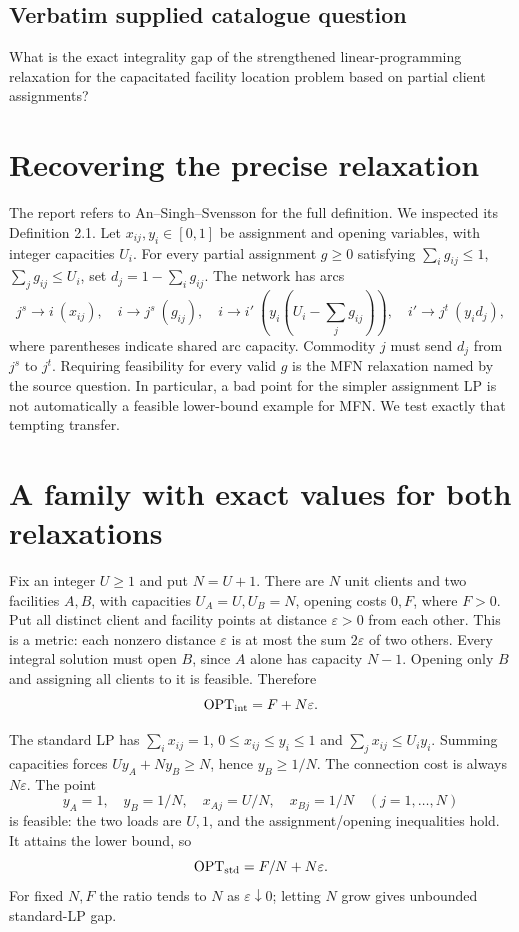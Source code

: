 \documentclass[11pt]{article}
\begin{document}
\subsection{Verbatim supplied catalogue question}
What is the exact integrality gap of the strengthened linear-programming relaxation for the capacitated facility location problem based on partial client assignments?

\section{Recovering the precise relaxation}
The report refers to An--Singh--Svensson for the full definition. We inspected
its Definition 2.1. Let $x_{ij},y_i\in[0,1]$ be assignment and opening
variables, with integer capacities $U_i$. For every partial assignment $g\ge0$
satisfying $\sum_i g_{ij}\le1$, $\sum_jg_{ij}\le U_i$, set
$d_j=1-\sum_i g_{ij}$. The network has arcs
\[
j^s\longrightarrow i\ (x_{ij}),\quad i\longrightarrow j^s\ (g_{ij}),\quad
i\longrightarrow i'\ \left(y_i\left(U_i-\sum_jg_{ij}\right)\right),\quad
i'\longrightarrow j^t\ (y_i d_j),
\]
where parentheses indicate shared arc capacity. Commodity $j$ must send $d_j$
from $j^s$ to $j^t$. Requiring feasibility for every valid $g$ is the
MFN relaxation named by the source question. In particular, a bad point for
the simpler assignment LP is not automatically a feasible lower-bound example
for MFN. We test exactly that tempting transfer.

\section{A family with exact values for both relaxations}
Fix an integer $U\ge1$ and put $N=U+1$. There are $N$ unit clients and two
facilities $A,B$, with capacities $U_A=U,U_B=N$, opening costs $0,F$,
where $F>0$. Put all distinct client and facility points at distance
$\varepsilon>0$ from each other. This is a metric: each nonzero distance
$\varepsilon$ is at most the sum $2\varepsilon$ of two others.
Every integral solution must open $B$, since $A$ alone has capacity $N-1$.
Opening only $B$ and assigning all clients to it is feasible. Therefore
\[
\mathrm{OPT}_{\rm int}=F+N\varepsilon.
\]

The standard LP has
$\sum_i x_{ij}=1$, $0\le x_{ij}\le y_i\le1$ and
$\sum_jx_{ij}\le U_i y_i$.
Summing capacities forces $U y_A+N y_B\ge N$, hence $y_B\ge1/N$.
The connection cost is always $N\varepsilon$. The point
\[
y_A=1,\quad y_B=1/N,\quad x_{Aj}=U/N,\quad x_{Bj}=1/N
\quad(j=1,\ldots,N)
\]
is feasible: the two loads are $U,1$, and the assignment/opening inequalities
hold. It attains the lower bound, so
\[
\mathrm{OPT}_{\rm std}=F/N+N\varepsilon.
\]
For fixed $N,F$ the ratio tends to $N$ as $\varepsilon\downarrow0$;
letting $N$ grow gives unbounded standard-LP gap.
\end{document}
